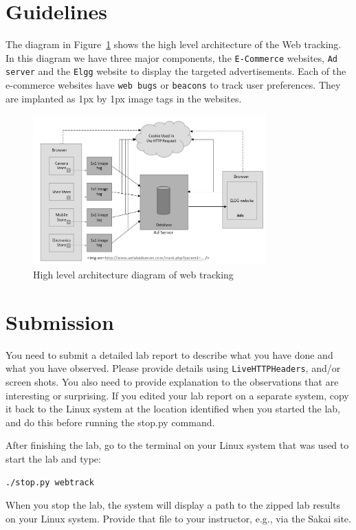\section{Guidelines}

The diagram in Figure~\ref{fig:guideline_figure} shows the high level architecture of the Web tracking. 
In this diagram we have three major components, the {\tt E-Commerce} websites, {\tt Ad server} and the {\tt Elgg} website to display the targeted advertisements. 
Each of the e-commerce websites have {\tt web bugs} or {\tt beacons} to track user preferences. 
They are implanted as 1px by 1px image tags in the websites.

	\begin{figure}
	\centering
	\includegraphics[width=0.8\textwidth,natwidth=621,natheight=403]{Figs/Guidelinefigure.jpg}
	\caption{High level architecture diagram of web tracking} 
	\label{fig:guideline_figure}
	\end{figure}


\section{Submission}

You need to submit a detailed lab report to describe what you have
done and what you have observed. Please provide details using 
{\tt LiveHTTPHeaders}, and/or screen shots. 
You also need to provide explanation
to the observations that are interesting or surprising.
If you edited your lab report on a separate system, copy it back to the Linux system at the location
identified when you started the lab, and do this before running the stop.py command.

After finishing the lab, go to the terminal on your Linux system that was used to start the lab and type:
\begin{verbatim}
./stop.py webtrack
\end{verbatim}
When you stop the lab, the system will display a path to the zipped lab results on your Linux system.  Provide that file to
your instructor, e.g., via the Sakai site.


